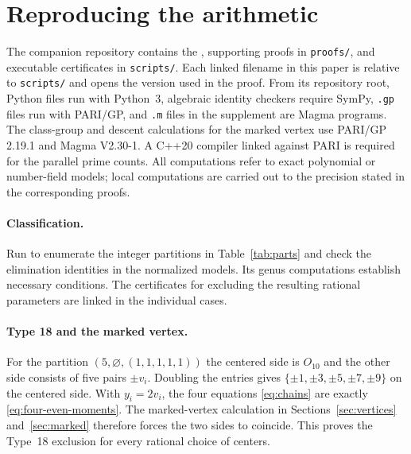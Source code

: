 \section{Reproducing the arithmetic}\label{app:verification}
The companion repository contains the \dossier{}, supporting proofs in \texttt{proofs/}, and executable certificates in \texttt{scripts/}. Each linked filename in this paper is relative to \texttt{scripts/} and opens the version used in the proof. From its repository root, Python files run with Python~3, algebraic identity checkers require SymPy, \texttt{.gp} files run with PARI/GP, and \texttt{.m} files in the supplement are Magma programs. The class-group and descent calculations for the marked vertex use PARI/GP 2.19.1 and Magma V2.30-1. A C++20 compiler linked against PARI is required for the parallel prime counts. All computations refer to exact polynomial or number-field models; local computations are carried out to the precision stated in the corresponding proofs.

\paragraph{Classification.} Run  to enumerate the integer partitions in Table~\ref{tab:parts} and check the elimination identities in the normalized models. Its genus computations establish necessary conditions. The certificates for excluding the resulting rational parameters are linked in the individual cases.

\paragraph{Type 18 and the marked vertex.}\label{app:type18}
For the partition \((5,\varnothing,(1,1,1,1,1))\) the centered side is \(O_{10}\) and the other side consists of five pairs \(\pm v_i\). Doubling the entries gives \(\{\pm1,\pm3,\pm5,\pm7,\pm9\}\) on the centered side. With \(y_i=2v_i\), the four equations \eqref{eq:chains} are exactly \eqref{eq:four-even-moments}. The marked-vertex calculation in Sections~\ref{sec:vertices} and~\ref{sec:marked} therefore forces the two sides to coincide. This proves the Type~18 exclusion for every rational choice of centers.

